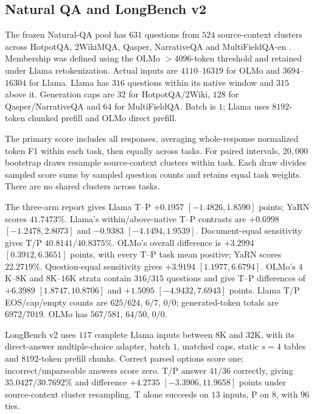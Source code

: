 \subsection{Natural QA and LongBench v2}
\label{sec:tailspline-natural-qa}\label{sec:natural-transfer-new}
The frozen Natural-QA pool has $631$ questions from $524$ source-context
clusters across HotpotQA, 2WikiMQA, Qasper, NarrativeQA and MultiFieldQA-en
\citep{bai2024longbench}. Membership was defined using the OLMo $>4096$-token
threshold and retained under Llama retokenization. Actual inputs are
$4110$--$16319$ for OLMo and $3694$--$16304$ for Llama. Llama has $316$
questions within its native window and $315$ above it. Generation caps are
$32$ for HotpotQA/2Wiki, $128$ for Qasper/NarrativeQA and $64$ for MultiFieldQA.
Batch is $1$; Llama uses $8192$-token chunked prefill and OLMo direct prefill.

The primary score includes all responses, averaging whole-response normalized
token F1 within each task, then equally across tasks. For paired intervals,
$20{,}000$ bootstrap draws resample source-context clusters within task.
Each draw divides sampled score sums by sampled question counts and retains
equal task weights.
There are no shared clusters across tasks.


The three-arm report gives Llama T--P $+0.1957$ $[-1.4826,1.8590]$ points;
YaRN scores $41.7473\%$. Llama's within/above-native T--P contrasts are $+0.6998$ $[-1.2478,2.8073]$
and $-0.9383$ $[-4.1494,1.9539]$. Document-equal sensitivity gives
T/P $40.8141/40.8375\%$. OLMo's overall difference is $+3.2994$
$[0.3912,6.3651]$ points, with every T--P task mean positive;
YaRN scores $22.2719\%$. Question-equal sensitivity gives $+3.9194$ $[1.1977,6.6794]$. OLMo's $4$K--$8$K and
$8$K--$16$K strata contain $316/315$ questions and give T--P differences of $+6.3989$
$[1.8747,10.8706]$ and $+1.5095$ $[-4.9432,7.6943]$ points.
Llama T/P EOS/cap/empty counts are $625/624$, $6/7$, $0/0$; generated-token
totals are $6972/7019$. OLMo has $567/581$, $64/50$, $0/0$.

LongBench v2 uses $117$ complete Llama inputs between $8$K and $32$K,
with its direct-answer multiple-choice adapter, batch $1$, matched caps,
static $s=4$ tables and $8192$-token prefill chunks. Correct parsed options
score one; incorrect/unparseable answers score zero. T/P answer $41/36$
correctly, giving $35.0427/30.7692\%$ and difference $+4.2735$
$[-3.3906,11.9658]$ points under source-context cluster resampling.
T alone succeeds on $13$ inputs, P on $8$, with $96$ ties.

